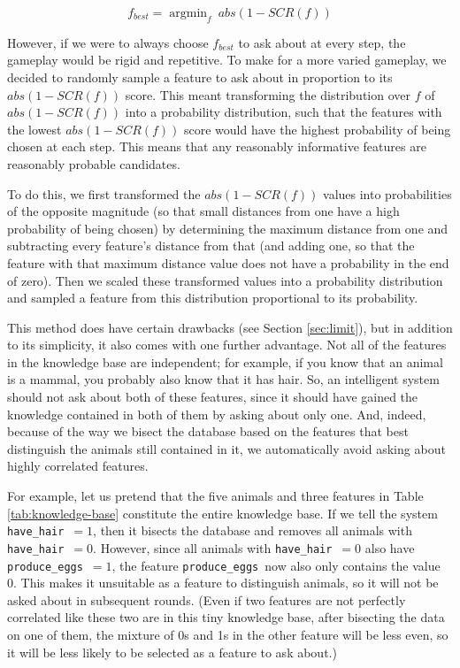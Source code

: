 \documentclass[11pt,a4paper]{article}
\DeclareMathOperator*{\argmin}{argmin}
\newcommand{\havehair}{\texttt{have\_hair}}
\newcommand{\produceeggs}{\texttt{produce\_eggs}}
\begin{document}
\begin{equation}
f_{best} = \argmin_f\ abs(1 - SCR(f)) 
\label{eq:bestfeat}
\end{equation}

However, if we were to always choose $f_{best}$ to ask about at every step, the gameplay would be rigid and repetitive.
To make for a more varied gameplay, we decided to randomly sample a feature to ask about in proportion to its $abs(1 - SCR(f))$ score. 
This meant transforming the distribution over $f$ of $abs(1 - SCR(f))$ into a probability distribution, such that the features with the lowest $abs(1 - SCR(f))$ score would have the highest probability of being chosen at each step.
This means that any reasonably informative features are reasonably probable candidates.

To do this, we first transformed the $abs(1 - SCR(f))$ values into probabilities of the opposite magnitude (so that small distances from one have a high probability of being chosen) by determining the maximum distance from one and subtracting every feature's distance from that (and adding one, so that the feature with that maximum distance value does not have a probability in the end of zero).
Then we scaled these transformed values into a probability distribution and sampled a feature from this distribution proportional to its probability.

This method does have certain drawbacks (see Section \ref{sec:limit}), but in addition to its simplicity, it also comes with one further advantage.
Not all of the features in the knowledge base are independent; for example, if you know that an animal is a mammal, you probably also know that it has hair.
So, an intelligent system should not ask about both of these features, since it should have gained the knowledge contained in both of them by asking about only one.
And, indeed, because of the way we bisect the database based on the features that best distinguish the animals still contained in it, we automatically avoid asking about highly correlated features.

For example, let us pretend that the five animals and three features in Table \ref{tab:knowledge-base} constitute the entire knowledge base.
If we tell the system \havehair\ $= 1$, then it bisects the database and removes all animals with \havehair\ $= 0$.
However, since all animals with \havehair\ $= 0$ also have \produceeggs\ $= 1$, the feature \produceeggs\ now also only contains the value 0.
This makes it unsuitable as a feature to distinguish animals, so it will not be asked about in subsequent rounds.
(Even if two features are not perfectly correlated like these two are in this tiny knowledge base, after bisecting the data on one of them, the mixture of 0s and 1s in the other feature will be less even, so it will be less likely to be selected as a feature to ask about.)
\end{document}
